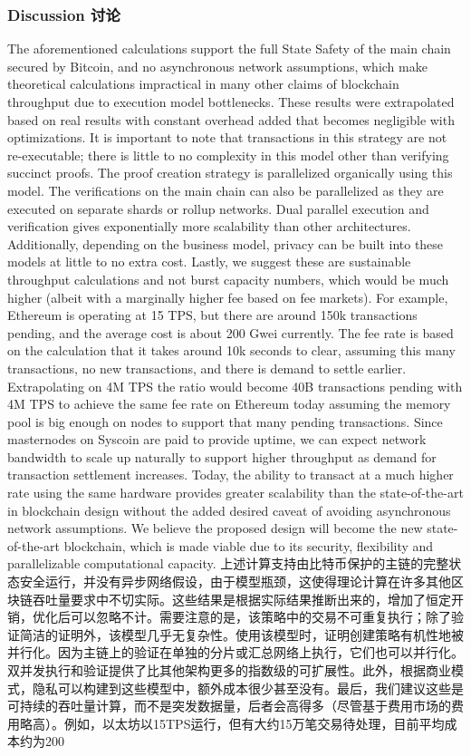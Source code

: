 \documentclass{ctexart}
\begin{document}
\subsubsection{Discussion 讨论}

The aforementioned calculations support the full State Safety of the main chain secured by Bitcoin, and no asynchronous network assumptions, which make theoretical calculations impractical in many other claims of blockchain throughput due to execution model bottlenecks. These results were extrapolated based on real results with constant overhead added that becomes negligible with optimizations. It is important to  note that transactions in this strategy are not re-executable; there is little to no complexity in this model other than verifying succinct proofs. The proof creation strategy is parallelized organically using this model. The verifications on the main chain can also be parallelized as they are executed on separate shards or rollup networks. Dual parallel execution and verification gives exponentially more scalability than other architectures. Additionally, depending on the business model, privacy can be built into these models at little to no extra cost. Lastly, we suggest  these are sustainable throughput calculations and not burst capacity numbers, which would be much higher (albeit with a marginally higher fee based on fee markets). For example, Ethereum is operating at 15 TPS, but there are around 150k transactions pending, and the average cost is about 200 Gwei currently. The fee rate is based on the calculation that it  takes around 10k seconds to clear, assuming this many transactions, no new transactions, and there is demand to settle earlier. Extrapolating on 4M TPS the ratio would become 40B transactions pending with 4M TPS to achieve the same fee rate on Ethereum today assuming the memory pool is big enough on nodes to support that many pending transactions. Since masternodes on Syscoin are paid to provide uptime, we can expect network bandwidth to scale up naturally to support higher throughput as demand for transaction settlement increases. Today, the ability to transact at a much higher rate using the same hardware provides greater scalability than the state-of-the-art in blockchain design without the added desired caveat of avoiding asynchronous network assumptions. We believe the proposed design will become the new state-of-the-art blockchain, which is made viable due to its security, flexibility and parallelizable computational capacity. 上述计算支持由比特币保护的主链的完整状态安全运行，并没有异步网络假设，由于模型瓶颈，这使得理论计算在许多其他区块链吞吐量要求中不切实际。这些结果是根据实际结果推断出来的，增加了恒定开销，优化后可以忽略不计。需要注意的是，该策略中的交易不可重复执行；除了验证简洁的证明外，该模型几乎无复杂性。使用该模型时，证明创建策略有机性地被并行化。因为主链上的验证在单独的分片或汇总网络上执行，它们也可以并行化。双并发执行和验证提供了比其他架构更多的指数级的可扩展性。此外，根据商业模式，隐私可以构建到这些模型中，额外成本很少甚至没有。最后，我们建议这些是可持续的吞吐量计算，而不是突发数据量，后者会高得多（尽管基于费用市场的费用略高）。例如，以太坊以15TPS运行，但有大约15万笔交易待处理，目前平均成本约为200 
\end{document}
